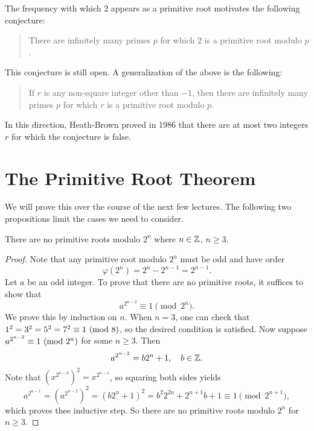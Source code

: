 \begin{remark}
  The frequency with which $2$ appears
  as a primitive root motivates the
  following conjecture:
  \begin{quote}
    \vspace{-2em}
    \begin{conjecture}
      There are infinitely many primes $p$
      for which $2$ is a primitive root
      modulo $p$.
    \end{conjecture}
  \end{quote}
  This conjecture is still open.
  A generalization of the above is
  the following:
  \begin{quote}
    \vspace{-2em}
    \begin{conjecture}[Artin]
      If $r$ is any non-square integer
      other than $-1$, then there are
      infinitely many primes $p$ for which
      $r$ is a primitive root modulo $p$.
    \end{conjecture}
  \end{quote}
  In this direction, Heath-Brown proved in
  1986 that there are at most two integers
  $r$ for which the conjecture is false.
\end{remark}

\section{The Primitive Root Theorem}

\begin{remark}
  We will prove this over the course
  of the next few lectures. The following
  two propositions limit the cases we need
  to consider.
\end{remark}

\begin{prop}
  There are no primitive roots modulo
  $2^n$ where $n \in \mathbb{Z}$, $n \ge 3$.
\end{prop}

\begin{proof}
  Note that any primitive root modulo
  $2^n$ must be odd and have order
  \[
    \varphi(2^n)
    = 2^n - 2^{n - 1} = 2^{n - 1}.
  \]
  Let $a$ be an odd integer. To prove that
  there are no primitive roots, it suffices
  to show that
  \[
    a^{2^{n - 2}} \equiv 1 \pmod{2^n}.
  \]
  We prove this by induction on $n$.
  When $n = 3$, one can check that
  $1^2 = 3^2 = 5^2 = 7^2 \equiv 1 \ (\mathrm{mod}\ 8)$,
  so the desired condition is satisfied.
  Now suppose $a^{2^{n - 2}} \equiv 1 \ (\mathrm{mod}\ 2^n)$
  for some $n \ge 3$. Then
  \[
    a^{2^{n - 2}}
    = b 2^n + 1, \quad b \in \mathbb{Z}.
  \]
  Note that
  $(x^{2^{n - 2}})^2 = x^{2^{n - 1}}$,
  so squaring both sides yields
  \[
    a^{2^{n - 1}}
    = (a^{2^{n - 2}})^2
    = (b 2^n + 1)^2
    = b^2 2^{2n} + 2^{n + 1} b + 1
    \equiv 1 \pmod{2^{n + 1}},
  \]
  which proves thee inductive step.
  So there are no primitive roots modulo
  $2^n$ for $n \ge 3$.
\end{proof}

